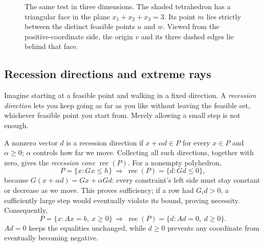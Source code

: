 \documentclass[11pt,a4paper]{article}
\begin{document}
\begin{figure}[H]
  \centering
  \caption{The same test in three dimensions. The shaded tetrahedron has a
    triangular face in the plane $x_1+x_2+x_3=3$. Its point $m$ lies strictly
    between the distinct feasible points $u$ and $w$. Viewed from the
    positive-coordinate side, the origin $v$ and its three dashed edges lie
    behind that face.}
  \label{fig:extreme-point-3d}
\end{figure}

\subsection{Recession directions and extreme rays}
Imagine starting at a feasible point and walking in a fixed direction. A
\emph{recession direction} lets you keep going as far as you like without
leaving the feasible set, whichever feasible point you start from. Merely
allowing a small step is not enough.

A nonzero vector $d$ is a recession direction if $x+\alpha d\in P$ for every
$x\in P$ and $\alpha\geq0$; $\alpha$ controls how far we move. Collecting all
such directions, together with zero, gives the \emph{recession cone}
$\operatorname{rec}(P)$. For a nonempty polyhedron,
\[
  P=\{x:Gx\leq h\}\ \Longrightarrow\ \operatorname{rec}(P)=\{d:Gd\leq0\},
\]
because $G(x+\alpha d)=Gx+\alpha Gd$: every constraint's left side must
stay constant or decrease as we move. This proves sufficiency; if a row had
$G_i d>0$, a sufficiently large step would eventually violate its bound,
proving necessity. Consequently,
\[
  P=\{x:Ax=b,\ x\geq0\}\ \Longrightarrow\
  \operatorname{rec}(P)=\{d:Ad=0,\ d\geq0\}.
\]
$Ad=0$ keeps the equalities unchanged, while $d\geq0$ prevents any coordinate
from eventually becoming negative.
\end{document}
